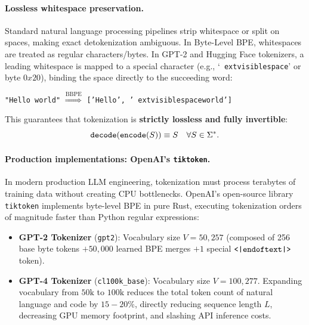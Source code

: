 \documentclass[../../main.tex]{subfiles}
\begin{document}
\paragraph{Lossless whitespace preservation.}
Standard natural language processing pipelines strip whitespace or split on spaces, making exact detokenization ambiguous. In Byte-Level BPE, whitespaces are treated as regular characters/bytes. In GPT-2 and Hugging Face tokenizers, a leading whitespace is mapped to a special character (e.g., `\texttt{{	extvisiblespace}}' or byte $0x20$), binding the space directly to the succeeding word:
\begin{center}
\texttt{"Hello world"} $\stackrel{\text{BBPE}}{\Longrightarrow}$ \texttt{['Hello', '{	extvisiblespace}world']}
\end{center}
This guarantees that tokenization is \textbf{strictly lossless and fully invertible}:
\begin{equation}
\label{eq:lossless_invertibility}
\text{\texttt{decode}}(\text{\texttt{encode}}(S)) \equiv S \quad \forall S \in \Sigma^*.
\end{equation}

\paragraph{Production implementations: OpenAI's \texttt{tiktoken}.}
In modern production LLM engineering, tokenization must process terabytes of training data without creating CPU bottlenecks. OpenAI's open-source library \texttt{tiktoken} implements byte-level BPE in pure Rust, executing tokenization orders of magnitude faster than Python regular expressions:
\begin{itemize}
    \item \textbf{GPT-2 Tokenizer} (\texttt{gpt2}): Vocabulary size $V = 50{,}257$ (composed of 256 base byte tokens $+ 50{,}000$ learned BPE merges $+ 1$ special $\text{\texttt{<|endoftext|>}}$ token).
    \item \textbf{GPT-4 Tokenizer} (\texttt{cl100k\_base}): Vocabulary size $V = 100{,}277$. Expanding vocabulary from $50\text{k}$ to $100\text{k}$ reduces the total token count of natural language and code by $15-20\%$, directly reducing sequence length $L$, decreasing GPU memory footprint, and slashing API inference costs.
\end{itemize}
\end{document}
